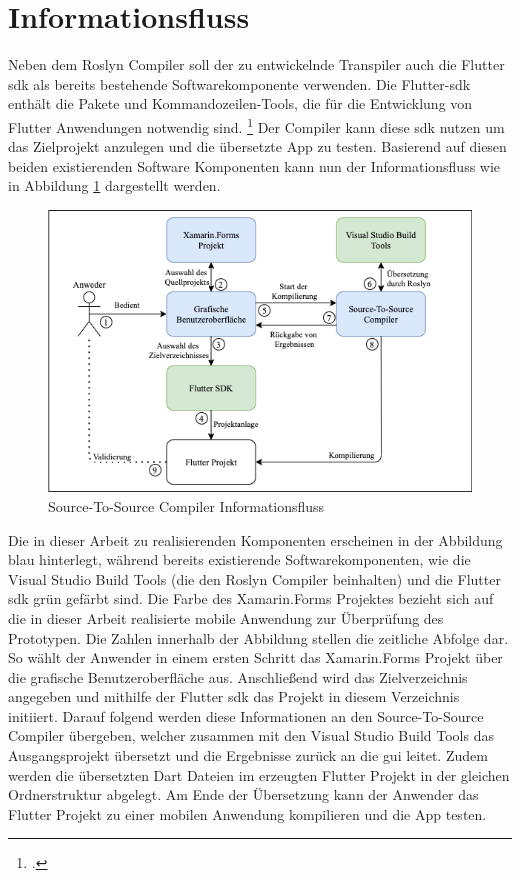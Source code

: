 \section{Informationsfluss}
Neben dem Roslyn Compiler soll der zu entwickelnde Transpiler auch die Flutter \ac{sdk}  als bereits bestehende Softwarekomponente verwenden.  Die Flutter-\ac{sdk} enthält die Pakete und Kommandozeilen-Tools,  die für die Entwicklung von Flutter Anwendungen notwendig sind.  \footcite[Vgl.][Abgerufen am \today]{GoogleFlutterSDK} Der Compiler kann diese \ac{sdk} nutzen um das Zielprojekt anzulegen und die übersetzte App zu testen.  Basierend auf diesen beiden existierenden Software Komponenten kann nun der Informationsfluss wie in Abbildung \ref{fig:Informationflow} dargestellt werden. 

\begin{figure}[!ht]
 \includegraphics[width=\textwidth,keepaspectratio]{Images/Implementation/IDE.png}
 \caption{Source-To-Source Compiler Informationsfluss}
 \label{fig:Informationflow}
\end{figure}

Die in dieser Arbeit zu realisierenden Komponenten erscheinen in der Abbildung blau hinterlegt,  während bereits existierende Softwarekomponenten, wie die \glq Visual Studio Build Tools\grq{} (die den Roslyn Compiler beinhalten) und die Flutter \ac{sdk} grün gefärbt sind.  Die Farbe des Xamarin.Forms Projektes bezieht sich auf die in dieser Arbeit realisierte mobile Anwendung zur Überprüfung des Prototypen.  Die Zahlen innerhalb der Abbildung stellen die zeitliche Abfolge dar.  So wählt der Anwender in einem ersten Schritt das Xamarin.Forms Projekt über die grafische Benutzeroberfläche aus.  Anschließend wird das Zielverzeichnis angegeben und mithilfe der Flutter \ac{sdk} das Projekt in diesem Verzeichnis initiiert.  Darauf folgend werden diese Informationen an den Source-To-Source Compiler übergeben, welcher zusammen mit den Visual Studio Build Tools das Ausgangsprojekt übersetzt und die Ergebnisse zurück an die \ac{gui} leitet.  Zudem werden die übersetzten Dart Dateien im erzeugten Flutter Projekt in der gleichen Ordnerstruktur abgelegt.  Am Ende der Übersetzung kann der Anwender das Flutter Projekt zu einer mobilen Anwendung kompilieren und die App testen.
